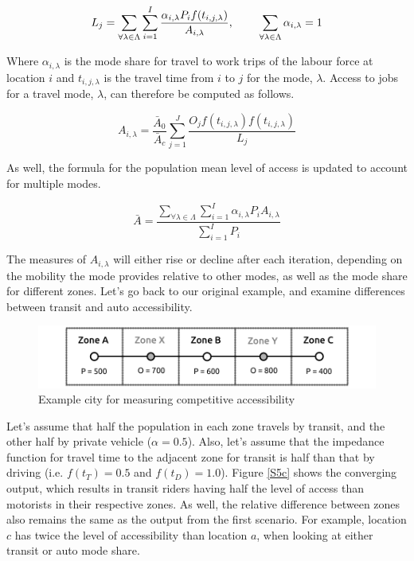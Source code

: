\documentclass[11 pt, letterpaper]{article}
\begin{document}
{\begin{equation}
L_j = \sum_{\forall \lambda \in \Lambda} \sum_{i = 1}^{I} \frac{ \alpha_{i,\lambda} P_i f(t_{i,j,\lambda})}{A_{i,\lambda}}, \hspace{8mm}
\sum_{\forall \lambda \in \Lambda} { \alpha_{i,\lambda} = 1}
\end{equation}

Where $\alpha_{i,\lambda}$ is the mode share for travel to work trips of the labour force at location $i$ and $t_{i,j,\lambda}$ is the travel time from $i$ to $j$ for the mode, $\lambda$. Access to jobs for a travel mode, $\lambda$, can therefore be computed as follows.

\begin{equation}
A_{i,\lambda} = \frac{\bar A_0}{\bar A_c} \sum_{j = 1}^{J} \frac{ O_j f(t_{i,j,\lambda}) f(t_{i,j,\lambda})}{L_{j}} 
\end{equation}

As well, the formula for the population mean level of access is updated to account for multiple modes.

\begin{equation}
\bar A = \frac{\sum_{\forall \lambda \in \Lambda} \sum_{i=1}^{I} \alpha_{i,\lambda} P_i A_{i,\lambda}}
{\sum_{i=1}^{I} P_i}
\end{equation}

The measures of $A_{i,\lambda}$ will either rise or decline after each iteration, depending on the mobility the mode provides relative to other modes, as well as the mode share for different zones. Let's go back to our original example, and examine differences between transit and auto accessibility.

\begin{figure}[H]
	\hspace{2mm}
	\caption{Example city for measuring competitive accessibility} 
	\label{S5}
	\centerline{\includegraphics[width=5in]{figures/linear_city/linear_city_S1.pdf}}
	\vspace{2mm}
\end{figure}

Let's assume that half the population in each zone travels by transit, and the other half by private vehicle ($\alpha = 0.5$). Also, let's assume that the impedance function for travel time to the adjacent zone for transit is half than that by driving (i.e. $f(t_T) = 0.5$ and $f(t_D) = 1.0$). Figure \ref{S5c} shows the converging output, which results in transit riders having half the level of access than motorists in their respective zones. As well, the relative difference between zones also remains the same as the output from the first scenario. For example, location $c$ has twice the level of accessibility than location $a$, when looking at either transit or auto mode share.

}
\end{document}
